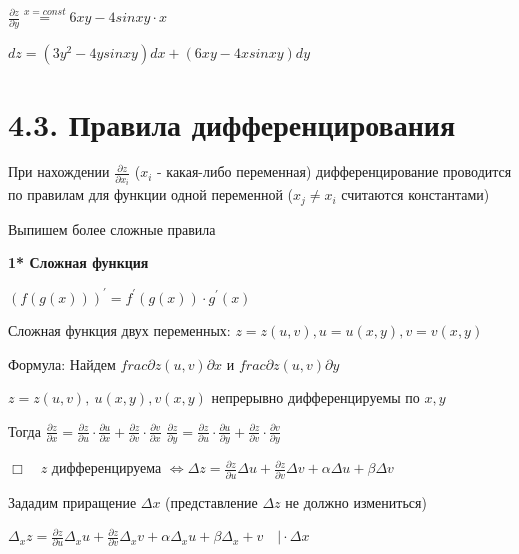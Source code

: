 \documentclass[12pt]{article}
\begin{document}
    $\displaystyle \frac{\partial z}{\partial y} \stackrel{x = const}{=} 6xy - 4sinxy \cdot x$

    $\displaystyle dz = (3y^2 - 4ysinxy)dx + (6xy - 4xsinxy)dy$
    
    \vspace{8mm}

    \section{4.3. Правила дифференцирования}

    \Nota При нахождении $\displaystyle \frac{\partial z}{\partial x_i}$ ($x_i$ - какая-либо переменная) дифференцирование проводится по правилам для функции одной переменной ($x_j \neq x_i$ считаются константами)

    Выпишем более сложные правила
    
    \vspace{3mm}

    \textbf{1* Сложная функция}

    \Mem $\displaystyle (f(g(x)))^\prime = f^\prime(g(x)) \cdot g^\prime(x)$

    \Def Сложная функция двух переменных: $\displaystyle z = z(u, v), u = u(x, y), v = v(x, y)$

    Формула: Найдем $\displaystyle frac{\partial z(u, v)}{\partial x}$ и $\displaystyle frac{\partial z(u, v)}{\partial y}$

    \Th $\displaystyle z = z(u, v), \ u(x, y), v(x, y)$ непрерывно дифференцируемы по $\displaystyle x, y$

    Тогда $\displaystyle \frac{\partial z}{\partial x} = \frac{\partial z}{\partial u} \cdot \frac{\partial u}{\partial x} + \frac{\partial z}{\partial v} \cdot \frac{\partial v}{\partial x}$
    $\displaystyle \frac{\partial z}{\partial y} = \frac{\partial z}{\partial u} \cdot \frac{\partial u}{\partial y} + \frac{\partial z}{\partial v} \cdot \frac{\partial v}{\partial y}$

    $\displaystyle \Box \quad z$ дифференцируема $\displaystyle \Longleftrightarrow \Delta z = \frac{\partial z}{\partial u} \Delta u + \frac{\partial z}{\partial v} \Delta v + \alpha \Delta u + \beta \Delta v$

    Зададим приращение $\displaystyle \Delta x$ (представление $\displaystyle \Delta z$ не должно измениться)

    $\displaystyle \Delta_x z = \frac{\partial z}{\partial u} \Delta_x u + \frac{\partial z}{\partial v} \Delta_x v + \alpha \Delta_x u + \beta \Delta_x + v \quad \Big| \cdot \Delta x$
\end{document}
